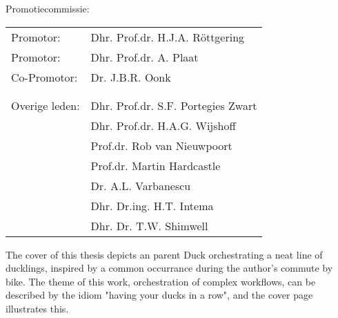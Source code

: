 

Promotiecommissie:



\begin{tabular}{ll}
    Promotor: &Dhr. Prof.dr. H.J.A. R{\"o}ttgering \\

Promotor: &Dhr. Prof.dr. A. Plaat \\

Co-Promotor: &Dr. J.B.R. Oonk \\

\\

\\

Overige leden: &Dhr. Prof.dr. S.F. Portegies Zwart\\

    &Dhr. Prof.dr. H.A.G. Wijshoff \\
    
    &Prof.dr. Rob van Nieuwpoort \\
    
    &Prof.dr. Martin Hardcastle \\
    
    &Dr. A.L. Varbanescu\\

    &Dhr. Dr.ing. H.T. Intema\\
    
    & Dhr. Dr. T.W. Shimwell\\

\end{tabular}


\vskip 3.0in

The cover of this thesis depicts an parent Duck orchestrating a neat line of ducklings, inspired by a common occurrance during the author's commute by bike. The theme of this work, orchestration of complex workflows, can be described by the idiom "having your ducks in a row", and the cover page illustrates this.
